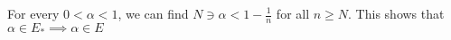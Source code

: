 \documentclass[preview]{standalone}
\begin{document}
\begin{center}
For every $0 < \alpha < 1$, we can find $N \ni \alpha < 1 - \frac{1}{n}$ for all $n \geq N$. This shows that $\alpha \in E_* \implies \alpha \in E$
\end{center}
\end{document}
